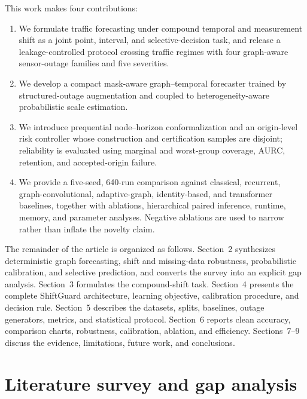 \documentclass[pdflatex,sn-mathphys-num]{sn-jnl}
\begin{document}
This work makes four contributions:
\begin{enumerate}
  \item We formulate traffic forecasting under compound temporal and
  measurement shift as a joint point, interval, and selective-decision task,
  and release a leakage-controlled protocol crossing traffic regimes with four
  graph-aware sensor-outage families and five severities.
  \item We develop a compact mask-aware graph--temporal forecaster trained by
  structured-outage augmentation and coupled to heterogeneity-aware
  probabilistic scale estimation.
  \item We introduce prequential node--horizon conformalization and an
  origin-level risk controller whose construction and certification samples
  are disjoint; reliability is evaluated using marginal and worst-group
  coverage, AURC, retention, and accepted-origin failure.
  \item We provide a five-seed, 640-run comparison against classical, recurrent,
  graph-convolutional, adaptive-graph, identity-based, and transformer
  baselines, together with ablations, hierarchical paired inference, runtime,
  memory, and parameter analyses. Negative ablations are used to narrow rather
  than inflate the novelty claim.
\end{enumerate}

The remainder of the article is organized as follows. Section~2 synthesizes
deterministic graph forecasting, shift and missing-data robustness,
probabilistic calibration, and selective prediction, and converts the survey
into an explicit gap analysis. Section~3 formulates the compound-shift task.
Section~4 presents the complete ShiftGuard architecture, learning objective,
calibration procedure, and decision rule. Section~5 describes the datasets,
splits, baselines, outage generators, metrics, and statistical protocol.
Section~6 reports clean accuracy, comparison charts, robustness, calibration,
ablation, and efficiency. Sections~7--9 discuss the evidence, limitations,
future work, and conclusions.

\section{Literature survey and gap analysis}
\end{document}
